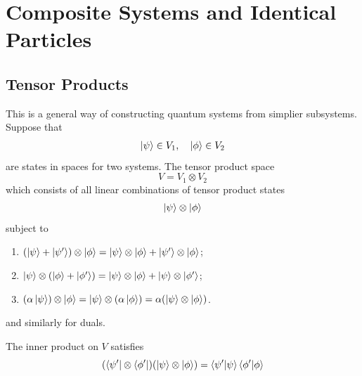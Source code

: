 \documentclass{article}
\begin{document}
\section{Composite Systems and Identical Particles}
\subsection{Tensor Products}
This is a general way of constructing quantum systems from simplier subsystems. Suppose that 
\begin{align*}
  \ket \psi \in V_1,\quad \ket \phi \in V_2
\end{align*}
are states in spaces for two systems. The tensor product space
\[
  V = V_1 \otimes V_2
\]
which consists of all linear combinations of tensor product states
\[
  \ket \psi \otimes \ket \phi
\]
subject to
\begin{enumerate}
	\item $ (\ket \psi + \ket {\psi'}) \otimes \ket \phi = \ket \psi \otimes \ket \phi + \ket {\psi'} \otimes \ket \phi $;
	\item $ \ket \psi \otimes (\ket \phi + \ket{\phi'}) = \ket \psi \otimes \ket \phi + \ket \psi \otimes \ket{\phi'} $;
		\item $ (\alpha \ket \psi) \otimes \ket \phi = \ket\psi\otimes (\alpha\ket \phi) = \alpha(\ket \psi\otimes \ket \phi) $.
\end{enumerate}
and similarly for duals.\par
The inner product on $ V $ satisfies
\[
	(\bra{\psi'}\otimes \bra {\phi'})(\ket \psi \otimes \ket\phi) = \bra{\psi'}\ket{\psi}\bra{\phi'}\ket{\phi}
\]
\end{document}
